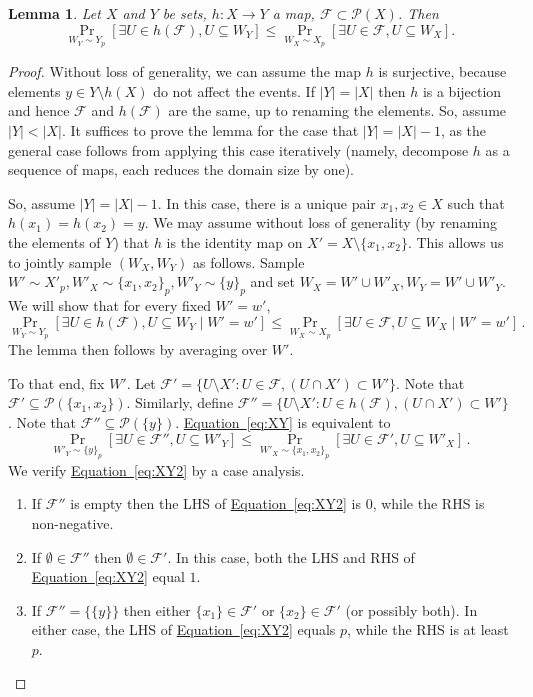 \documentclass[11pt]{article}
\numberwithin{equation}{section}
\newtheorem{lemma}[theorem]{Lemma}
\theoremstyle{definition}
\theoremstyle{plain}
\newcommand{\expeqref}[2]{\hyperref[#2]{#1~\eqref{#2}}}
\newcommand{\calF}{\mathcal{F}} %
\begin{document}
\begin{lemma}
\label{lemma:compress}
Let $X$ and $Y$ be sets, $h:X \to Y$ a map, $\calF \subset \mathcal{P}(X)$.
Then
$$
\Pr_{W_{Y}\sim Y_{p}}[\exists U\in h(\calF), U\subseteq W_{Y}]\leq
\Pr_{W_{X}\sim X_{p}}[\exists U\in\calF, U\subseteq W_{X}].
$$
\end{lemma}

\begin{proof}
Without loss of generality, we can assume the map $h$ is surjective, because elements $y\in Y\setminus h(X)$ do not affect the events.
If $|Y|=|X|$ then $h$ is a bijection and hence $\calF$ and $h(\calF)$ are the same, up to renaming the elements.
So, assume $|Y|<|X|$. It suffices to prove the lemma for the case that $|Y|=|X|-1$, as the general case follows from applying this case iteratively
(namely, decompose $h$ as a sequence of maps, each reduces the domain size by one).

So, assume $|Y|=|X|-1$. In this case, there is a unique pair $x_1,x_2 \in X$ such that $h(x_1)=h(x_2)=y$. We may assume without loss of generality
(by renaming the elements of $Y$) that $h$ is the identity map on $X'=X \setminus \{x_1,x_2\}$.
This allows us to jointly sample $(W_X,W_Y)$ as follows.
Sample $W' \sim X'_p, W'_X \sim \{x_1,x_2\}_p, W'_Y \sim \{y\}_p$ and set $W_X = W' \cup W'_X, W_Y = W' \cup W'_Y$.
We will show that for every fixed $W'=w'$,
\begin{equation}
\label{eq:XY}
\Pr_{W_{Y}\sim Y_{p}}[\exists U \in h(\calF), U \subseteq W_{Y} \; | \; W'=w']\leq
\Pr_{W_{X}\sim X_{p}}[\exists U \in\calF, U\subseteq W_{X} \; | \; W'=w']\,.
\end{equation}
The lemma then follows by averaging over $W'$.

To that end, fix $W'$. Let $\mathcal{F'} = \{U \setminus X': U \in \calF, (U \cap X') \subset W'\}$.
Note that $\mathcal{F'} \subseteq \mathcal{P}(\{x_1,x_2\})$. Similarly, define
$\mathcal{F''}  = \{U \setminus X': U \in h(\calF), (U \cap X') \subset W'\}$.
Note that $\mathcal{F''} \subseteq \mathcal{P}(\{y\})$. \expeqref{Equation}{eq:XY} is equivalent to
\begin{equation}
\label{eq:XY2}
\Pr_{W'_{Y}\sim \{y\}_{p}}[\exists U \in \mathcal{F''} , U \subseteq W'_{Y}]\leq
\Pr_{W'_{X}\sim \{x_1,x_2\}_{p}}[\exists U\in\mathcal{F'}, U \subseteq W'_{X}]\,.
\end{equation}
We verify \expeqref{Equation}{eq:XY2} by a case analysis.
\begin{enumerate}
\item[(i)] If $\mathcal{F''}$ is empty then the LHS of \expeqref{Equation}{eq:XY2} is $0$, while the RHS is non-negative.
\item[(ii)] If $\emptyset \in \mathcal{F''}$ then $\emptyset \in \mathcal{F'}$. In this case, both the LHS and RHS of
\expeqref{Equation}{eq:XY2} equal $1$.
\item[(iii)] If $\mathcal{F''} = \{\{y\}\}$ then either $\{x_1\} \in \mathcal{F'}$ or $\{x_2\} \in \mathcal{F'}$ (or possibly both).
In either case, the LHS of \expeqref{Equation}{eq:XY2} equals $p$, while the RHS is at least $p$.
\end{enumerate}
\end{proof}
\end{document}
